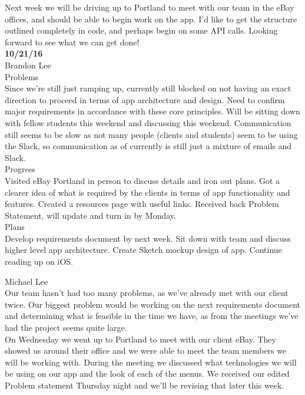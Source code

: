 \documentclass[letterpaper,10pt,titlepage]{article}
\begin{document}
Next week we will be driving up to Portland to meet with our team in the eBay offices, and should be able to begin work on the app. I'd like to get the structure outlined completely in code, and perhaps begin on some API calls. Looking forward to see what we can get done!\\

\textbf{10/21/16}\\

Brandon Lee\\

Problems\\

Since we're still just ramping up, currently still blocked on not having an exact direction to proceed in terms of app architecture and design. Need to confirm major requirements in accordance with these core principles. Will be sitting down with fellow students this weekend and discussing this weekend.
Communication still seems to be slow as not many people (clients and students) seem to be using the Slack, so communication as of currently is still just a mixture of emails and Slack.\\

Progress\\

Visited eBay Portland in person to discuss details and iron out plans.
Got a clearer idea of what is required by the clients in terms of app functionality and features.
Created a resources page with useful links.
Received back Problem Statement, will update and turn in by Monday.\\

Plans\\
Develop requirements document by next week.
Sit down with team and discuss higher level app architecture.
Create Sketch mockup design of app.
Continue reading up on iOS.

Michael Lee\\

Our team hasn't had too many problems, as we've already met with our client twice. Our biggest problem would be working on the next requirements document and determining what is feasible in the time we have, as from the meetings we've had the project seems quite large.\\

On Wednesday we went up to Portland to meet with our client eBay. They showed us around their office and we were able to meet the team members we will be working with. During the meeting we discussed what technologies we will be using on our app and the look of each of the menus. We received our edited Problem statement Thursday night and we'll be revising that later this week.\\
\end{document}
